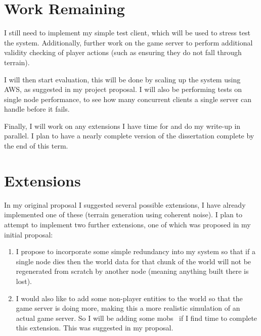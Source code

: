 \documentclass[11pt,a4paper]{article}
\begin{document}
	\section{Work Remaining}
	I still need to implement my simple test client, which will be used to stress test the system. Additionally, further work on the game server to perform additional validity checking of player actions (such as ensuring they do not fall through terrain).
	
	I will then start evaluation, this will be done by scaling up the system using AWS, as suggested in my project proposal. I will also be performing tests on single node performance, to see how many concurrent clients a single server can handle before it fails.
	
	Finally, I will work on any extensions I have time for and do my write-up in parallel. I plan to have a nearly complete version of the dissertation complete by the end of this term.
	\section{Extensions}
	In my original proposal I suggested several possible extensions, I have already implemented one of these (terrain generation using coherent noise). I plan to attempt to implement two further extensions, one of which was proposed in my initial proposal:
	\begin{enumerate}
		\item I propose to incorporate some simple redundancy into my system so that if a single node dies then the world data for that chunk of the world will not be regenerated from scratch by another node (meaning anything built there is lost).
		\item I would also like to add some non-player entities to the world so that the game server is doing more, making this a more realistic simulation of an actual game server. So I will be adding some mobs~\cite{mob} if I find time to complete this extension. This was suggested in my proposal.
	\end{enumerate}
\end{document}
